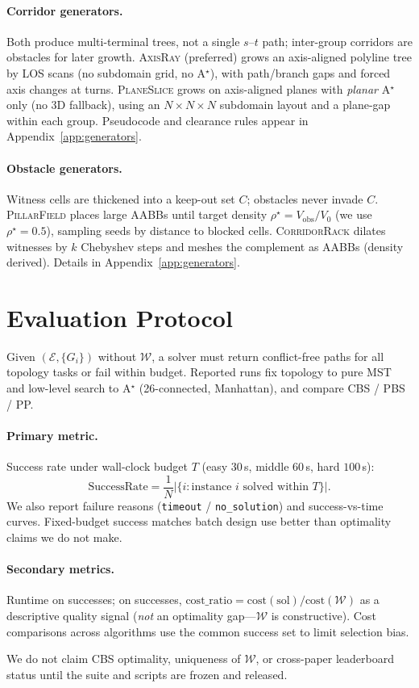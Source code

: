 \paragraph{Corridor generators.}
Both produce multi-terminal trees, not a single $s$--$t$ path; inter-group
corridors are obstacles for later growth.
\textsc{AxisRay} (preferred) grows an axis-aligned polyline tree by LOS scans
(no subdomain grid, no A$^\star$), with path/branch gaps and forced axis
changes at turns.
\textsc{PlaneSlice} grows on axis-aligned planes with \emph{planar} A$^\star$
only (no 3D fallback), using an $N{\times}N{\times}N$ subdomain layout and a
plane-gap within each group.
Pseudocode and clearance rules appear in Appendix~\ref{app:generators}.

\paragraph{Obstacle generators.}
Witness cells are thickened into a keep-out set $C$; obstacles never invade
$C$.
\textsc{PillarField} places large AABBs until target density
$\rho^\star{=}V_{\mathrm{obs}}/V_0$ (we use $\rho^\star{=}0.5$), sampling seeds
by distance to blocked cells.
\textsc{CorridorRack} dilates witnesses by $k$ Chebyshev steps and meshes the
complement as AABBs (density derived). Details in
Appendix~\ref{app:generators}.

\section{Evaluation Protocol}
\label{sec:eval}

Given $(\mathcal{E},\{G_i\})$ without $\mathcal{W}$, a solver must return
conflict-free paths for all topology tasks or fail within budget.
Reported runs fix topology to pure MST and low-level search to A$^\star$
(26-connected, Manhattan), and compare CBS / PBS / PP.

\paragraph{Primary metric.}
Success rate under wall-clock budget $T$ (easy $30\,$s, middle $60\,$s, hard
$100\,$s):
\[
  \mathrm{SuccessRate}
  = \frac{1}{N}\bigl|\{ i : \text{instance $i$ solved within $T$}\}\bigr|.
\]
We also report failure reasons (\texttt{timeout} / \texttt{no\_solution}) and
success-vs-time curves. Fixed-budget success matches batch design use better
than optimality claims we do not make.

\paragraph{Secondary metrics.}
Runtime on successes; on successes,
$\mathrm{cost\_ratio}=\mathrm{cost}(\mathrm{sol})/\mathrm{cost}(\mathcal{W})$
as a descriptive quality signal (\emph{not} an optimality gap---$\mathcal{W}$
is constructive). Cost comparisons across algorithms use the common success
set to limit selection bias.

We do not claim CBS optimality, uniqueness of $\mathcal{W}$, or
cross-paper leaderboard status until the suite and scripts are frozen and
released.

